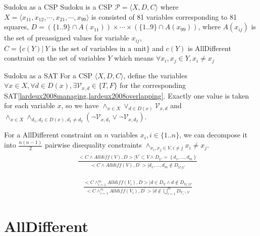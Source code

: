 \documentclass[10pt,aspectratio=43,mathserif]{beamer}
\begin{document}
\begin{frame}{Sudoku as a CSP}
     Sudoku is a CSP $\mathcal P=\langle X, D, C\rangle$ where $X=\langle x_{11}, x_{12}, \cdots, x_{21}, \cdots, x_{99}\rangle$ is consisted of 81 variables corresponding to 81 squares, $D=(\{1..9\}\cap A(x_{11}))\times\cdots\times(\{1..9\}\cap A(x_{99}))$, where $A(x_{ij})$ is the set of preassigned values for variable $x_{ij}$,  $C=\{c(Y)|\ Y \text{ is the set of variables in a unit}\}$ and $c(Y)$ is AllDifferent constraint on the set of variables $Y$ which means $\forall x_i,x_j\in Y,
            x_i\neq x_j$
\end{frame}

\begin{frame}{Sudoku as a SAT}
    For a CSP $\langle X,D,C\rangle$, define the variables $\forall x\in X, \forall d\in D(x), \exists\mathcal V_{x,d}\in \{T,F\}$ for the corresponding SAT\ref{lardeux2008managing,lardeux2008overlapping}. Exactly one value is taken for each variable $x$, so we have $\land_{x\in X}\vee_{d\in D(x)} \mathcal V_{x,d}$ and $\land_{x\in X}\land_{d_1,d_2\in
            D(x),d_1\neq d_2}(\neg \mathcal V_{x,d_1} \vee \neg \mathcal V_{x,d_2})$.

            For a AllDifferent constraint on $n$ variables $x_i, i\in \{1..n\}$, we can decompose it into $\frac{n(n-1)}{2}$ pairwise disequality constraints $\land_{x_i,x_j\in V, i\neq j} x_i\neq x_j$.
\begin{align}
                & \quad \frac{<C \wedge Alldiff(V), D>| V^{\prime} \subset V \wedge D_{V^{\prime}}=\left\{d_{1}, \ldots, d_{m}\right\}}{<C \wedge Alldiff(V), D^{\prime}>| d_{1}, \ldots, d_{m} \notin D_{V \setminus V^{\prime}}}
                \label{Om}
                \tag{Om}
            \end{align}

            \begin{align}
                & \quad \frac{<C \wedge_{i=1}^{m} Alldiff(V_{i}), D>| d \in D_{V} \wedge d \notin D_{V_{1} \setminus V}}{<C \wedge_{i=1}^{m} Alldiff(V_{i}), D^{\prime}>| d \notin \bigcup_{i=1}^{m} D_{V_{i} \backslash V}}
                \label{OIm}
                \tag{OIm}
            \end{align}
\end{frame}

\section{AllDifferent}
\end{document}
